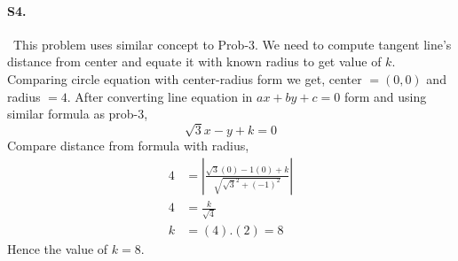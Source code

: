 \documentclass{article}
\begin{document}
\paragraph{S4.}\
This problem uses similar concept to Prob-3. We need to compute tangent line's distance from center and equate it with known radius to get value of $k$. Comparing circle equation with center-radius form we get, center $=(0,0)$ and radius $=4$. After converting line equation in $ax+by+c=0$ form and using similar formula as prob-3, 
\begin{equation*}
    \sqrt{3}x-y+k=0
\end{equation*}
Compare distance from formula with radius,
\begin{align*}
    4&=\left|\frac{\sqrt{3}(0)-1(0)+k}{\sqrt{\sqrt{3}^2+(-1)^2}}\right|\\
    4&=\frac{k}{\sqrt{4}}\\
    k&=(4).(2)=8
\end{align*}
Hence the value of $k=8$.
\end{document}
